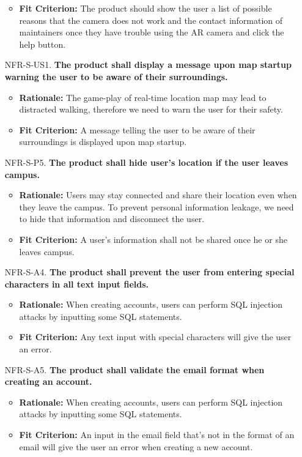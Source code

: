 \documentclass{article}
\begin{document}
\begin{itemize}
\begin{itemize}
        \item \textbf{Fit Criterion:} The product should show the user a list of possible reasons that the camera does not work and the contact information of maintainers once they have trouble using the AR camera and click the help button.
    \end{itemize}
    \item[NFR-S-US1.] \textbf{The product shall display a message upon map startup warning the user to be aware of their surroundings.}
    \begin{itemize}
        \item \textbf{Rationale:} The game-play of real-time location map may lead to distracted walking, therefore we need to warn the user for their safety.
        \item \textbf{Fit Criterion:} A message telling the user to be aware of their surroundings is displayed upon map startup.
    \end{itemize}
    \item[NFR-S-P5.] \textbf{The product shall hide user's location if the user leaves campus.}
    \begin{itemize}
        \item \textbf{Rationale:} Users may stay connected and share their location even when they leave the campus. To prevent personal information leakage, we need to hide that information and disconnect the user.
        \item \textbf{Fit Criterion:} A user's information shall not be shared once he or she leaves campus.
    \end{itemize}
    \item[NFR-S-A4.] \textbf{The product shall prevent the user from entering special characters in all text input fields.}
    \begin{itemize}
        \item \textbf{Rationale:} When creating accounts, users can perform SQL injection attacks by inputting some SQL statements.
        \item \textbf{Fit Criterion:} Any text input with special characters will give the user an error.
    \end{itemize}
    \item[NFR-S-A5.] \textbf{The product shall validate the email format when creating an account.}
    \begin{itemize}
        \item \textbf{Rationale:} When creating accounts, users can perform SQL injection attacks by inputting some SQL statements.
        \item \textbf{Fit Criterion:} An input in the email field that's not in the format of an email will give the user an error when creating a new account.
    \end{itemize}
\end{itemize}
\end{document}
